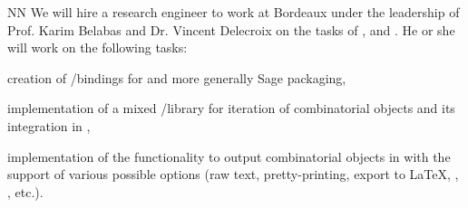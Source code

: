 \begin{participant}[type=R, PM=30]{NN}
We will hire a research engineer to work at Bordeaux
 under the leadership of Prof. Karim Belabas and Dr. Vincent
Delecroix on the tasks of ,  and .
He or she will work on the following tasks:
\begin{compactitem}
\item creation of \Cython/\Python bindings for \PariGP and more generally Sage packaging,
\item implementation of a mixed /\Python library for iteration of combinatorial
objects and its integration in \Sage,
\item implementation of the functionality to output combinatorial objects in \Sage
with the support of various possible options (raw text, pretty-printing, export to 
\LaTeX, , , etc.).
\end{compactitem}
\end{participant}
